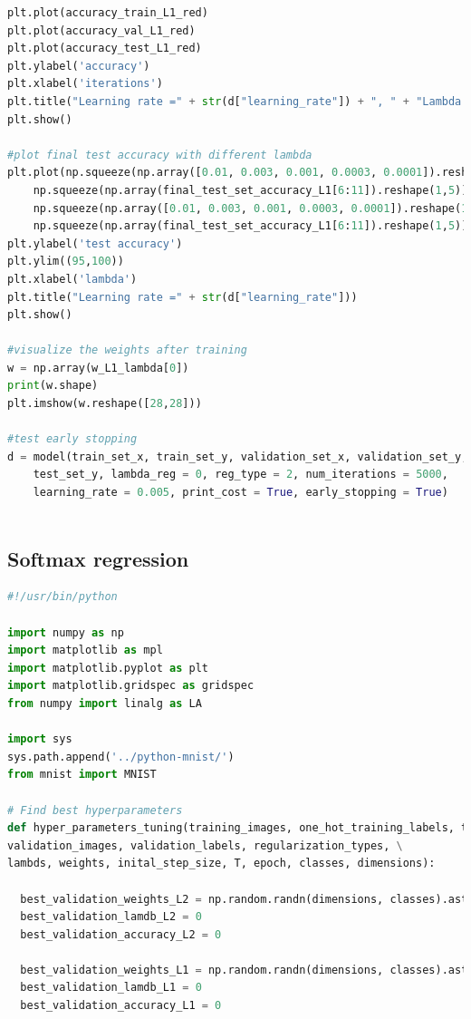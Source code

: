 \documentclass{article} %
\begin{document}
{\begin{lstlisting}[language=Python]
plt.plot(accuracy_train_L1_red)
plt.plot(accuracy_val_L1_red)
plt.plot(accuracy_test_L1_red)
plt.ylabel('accuracy')
plt.xlabel('iterations')
plt.title("Learning rate =" + str(d["learning_rate"]) + ", " + "Lambda =" + str(1))
plt.show()

#plot final test accuracy with different lambda
plt.plot(np.squeeze(np.array([0.01, 0.003, 0.001, 0.0003, 0.0001]).reshape(1,5)),
	np.squeeze(np.array(final_test_set_accuracy_L1[6:11]).reshape(1,5)), 
	np.squeeze(np.array([0.01, 0.003, 0.001, 0.0003, 0.0001]).reshape(1,5)),
	np.squeeze(np.array(final_test_set_accuracy_L1[6:11]).reshape(1,5)), 'or')
plt.ylabel('test accuracy')
plt.ylim((95,100))
plt.xlabel('lambda')
plt.title("Learning rate =" + str(d["learning_rate"]))
plt.show()

#visualize the weights after training
w = np.array(w_L1_lambda[0])
print(w.shape)
plt.imshow(w.reshape([28,28]))

#test early stopping
d = model(train_set_x, train_set_y, validation_set_x, validation_set_y, test_set_x, 
	test_set_y, lambda_reg = 0, reg_type = 2, num_iterations = 5000, 
	learning_rate = 0.005, print_cost = True, early_stopping = True)



\end{lstlisting}

\subsection{Softmax regression}
\begin{lstlisting}[language=Python]
#!/usr/bin/python 

import numpy as np
import matplotlib as mpl
import matplotlib.pyplot as plt
import matplotlib.gridspec as gridspec
from numpy import linalg as LA

import sys
sys.path.append('../python-mnist/')
from mnist import MNIST

# Find best hyperparameters 
def hyper_parameters_tuning(training_images, one_hot_training_labels, test_images,test_labels,\
validation_images, validation_labels, regularization_types, \
lambds, weights, inital_step_size, T, epoch, classes, dimensions):

  best_validation_weights_L2 = np.random.randn(dimensions, classes).astype(np.float32) 
  best_validation_lamdb_L2 = 0
  best_validation_accuracy_L2 = 0
	
  best_validation_weights_L1 = np.random.randn(dimensions, classes).astype(np.float32) 
  best_validation_lamdb_L1 = 0
  best_validation_accuracy_L1 = 0
	

\end{lstlisting}}
\end{document}
